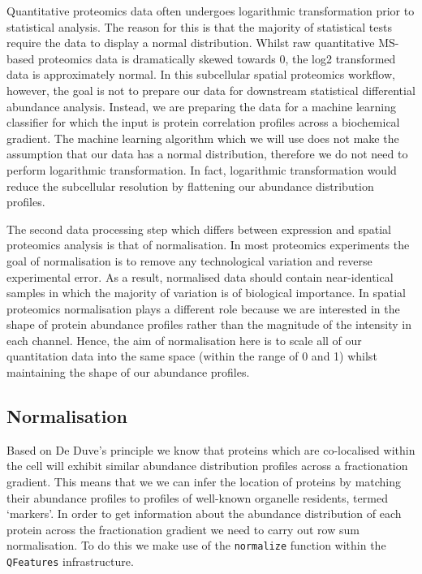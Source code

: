 \documentclass[9pt,a4paper,]{extarticle}
\begin{document}
Quantitative proteomics data often undergoes logarithmic transformation prior to
statistical analysis. The reason for this is that the majority of statistical
tests require the data to display a normal distribution. Whilst raw quantitative
MS-based proteomics data is dramatically skewed towards 0, the log2 transformed
data is approximately normal. In this subcellular spatial proteomics workflow,
however, the goal is not to prepare our data for downstream statistical differential
abundance analysis. Instead, we are preparing the data for a machine learning
classifier for which the input is protein correlation profiles across a
biochemical gradient. The machine learning algorithm which we will use does
not make the assumption that our data has a normal distribution, therefore we
do not need to perform logarithmic transformation. In fact, logarithmic
transformation would reduce the subcellular resolution by flattening our abundance
distribution profiles.

The second data processing step which differs between expression and spatial
proteomics analysis is that of normalisation. In most proteomics experiments the
goal of normalisation is to remove any technological variation and reverse
experimental error. As a result, normalised data should contain near-identical
samples in which the majority of variation is of biological importance. In spatial
proteomics normalisation plays a different role because we are interested in the
shape of protein abundance profiles rather than the magnitude of the intensity in
each channel. Hence, the aim of normalisation here is to scale all of our
quantitation data into the same space (within the range of 0 and 1) whilst
maintaining the shape of our abundance profiles.

\subsection{Normalisation}\label{normalisation}

Based on De Duve's principle \citep{deDuve1964} we know that proteins which are
co-localised within the cell will exhibit similar abundance distribution profiles
across a fractionation gradient. This means that we we can infer the location of
proteins by matching their abundance profiles to profiles of well-known organelle
residents, termed `markers'. In order to get information about the abundance
distribution of each protein across the fractionation gradient we need to carry
out row sum normalisation. To do this we make use of the \texttt{normalize} function
within the \texttt{QFeatures} infrastructure.
\end{document}
